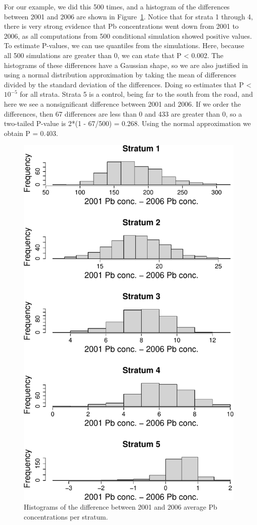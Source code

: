 \documentclass[12pt, titlepage]{article}
\begin{document}
For our example, we did this 500 times, and a histogram of the differences between 2001 and 2006 are shown in Figure~\ref{Fig:MossDiffHist}.  Notice that for strata 1 through 4, there is very strong evidence that Pb concentrations went down from 2001 to 2006, as all computations from 500 conditional simulation showed positive values.  To estimate P-values, we can use quantiles from the simulations.  Here, because all 500 simulations are greater than 0, we can state that P < 0.002. The histograms of these differences have a Gaussian shape, so we are also justified in using a normal distribution approximation by taking the mean of differences divided by the standard deviation of the differences.  Doing so estimates that P < $10^{-5}$ for all strata.  Strata 5 is a control, being far to the south from the road, and here we see a nonsignificant difference between 2001 and 2006.  If we order the differences, then 67 differences are less than 0 and 433 are greater than 0, so a two-tailed P-value is 2*(1 - 67/500) = 0.268.  Using the normal approximation we obtain P = 0.403.

\begin{figure}[H]
  \begin{center}
	    \includegraphics[width=0.5\linewidth]{Moss_diffhist}
  \end{center}
  \caption{Histograms of the difference between 2001 and 2006 average Pb concentrations per stratum. \label{Fig:MossDiffHist}}
\end{figure}
\end{document}
